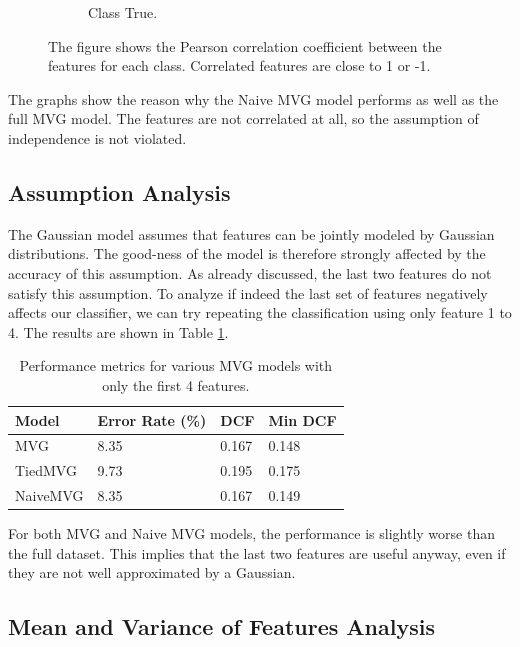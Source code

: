 \documentclass{article}
\begin{document}
\begin{figure}[ht]
\begin{subfigure}[b]{0.45\textwidth}
        \caption{Class True.}
    \end{subfigure}
    \caption{The figure shows the Pearson correlation coefficient between the features for each class. Correlated features are close to 1 or -1.}
    \label{fig:dataset_person}
\end{figure}

The graphs show the reason why the Naive MVG model performs as well as the full MVG model. The features are not correlated at all, so the assumption of independence is not violated. 

\subsection{Assumption Analysis}

The Gaussian model assumes that features can be jointly modeled by Gaussian distributions. The good-ness of the model is therefore strongly affected by the accuracy of this assumption. As already discussed, the last two features do not satisfy this assumption. To analyze if indeed the last set of features negatively affects our classifier, we can try repeating the classification using only feature 1 to 4. The results are shown in Table \ref{tab:mvg_performance_4}.

\begin{table}[ht!]
    \centering
    \begin{tabularx}{\textwidth}{lXXX}
        \toprule
        \textbf{Model} & \textbf{Error Rate (\%)} & \textbf{DCF} & \textbf{Min DCF} \\
        \midrule
        MVG      & 8.35 & 0.167 & 0.148 \\
        TiedMVG  & 9.73 & 0.195 & 0.175 \\
        NaiveMVG & 8.35 & 0.167 & 0.149 \\
        \bottomrule
    \end{tabularx}
    \caption{Performance metrics for various MVG models with only the first 4 features.}
    \label{tab:mvg_performance_4}
\end{table}

For both MVG and Naive MVG models, the performance is slightly worse than the full dataset. This implies that the last two features are useful anyway, even if they are not well approximated by a Gaussian. 

\subsection{Mean and Variance of Features Analysis}
\end{document}
